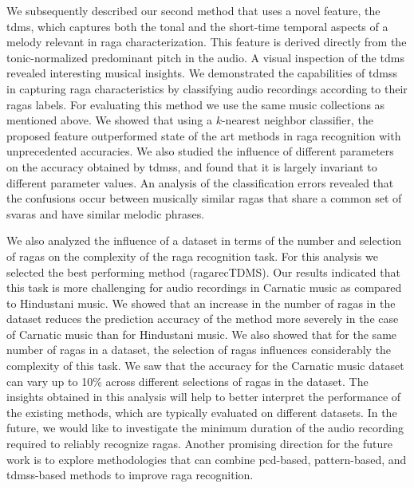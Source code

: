 We subsequently described our second method that uses a novel feature, the \acrshort{tdms}, which captures both the tonal and the short-time temporal aspects of a melody relevant in \gls{raga} characterization. This feature is derived directly from the tonic-normalized predominant pitch in the audio. A visual inspection of the \acrshort{tdms} revealed interesting musical insights. We demonstrated the capabilities of \glspl{tdms} in capturing \gls{raga} characteristics by classifying audio recordings according to their \glspl{raga} labels. For evaluating this method we use the same music collections as mentioned above. We showed that using a $k$-nearest neighbor classifier, the proposed feature outperformed state of the art methods in \gls{raga} recognition with unprecedented accuracies. We also studied the influence of different parameters on the accuracy obtained by \glspl{tdms}, and found that it is largely invariant to different parameter values. An analysis of the classification errors revealed that the confusions occur between musically similar \glspl{raga} that share a common set of \glspl{svara} and have similar melodic phrases. 

We also analyzed the influence of a dataset in terms of the number and selection of \glspl{raga} on the complexity of the \gls{raga} recognition task. For this analysis we selected the best performing method (\acrshort{ragarecTDMS}). Our results indicated that this task is more challenging for audio recordings in Carnatic music as compared to Hindustani music. We showed that an increase in the number of \glspl{raga} in the dataset reduces the prediction accuracy of the method more severely in the case of Carnatic music than for Hindustani music. We also showed that for the same number of \glspl{raga} in a dataset, the selection of \glspl{raga} influences considerably the complexity of this task. We saw that the accuracy for the Carnatic music dataset can vary up to 10\% across different selections of \glspl{raga} in the dataset. The insights obtained in this analysis will help to better interpret the performance of the existing methods, which are typically evaluated on different datasets. In the future, we would like to investigate the minimum duration of the audio recording required to reliably recognize \glspl{raga}. Another promising direction for the future work is to explore methodologies that can combine \gls{pcd}-based, pattern-based, and \glspl{tdms}-based methods to improve \gls{raga} recognition.

